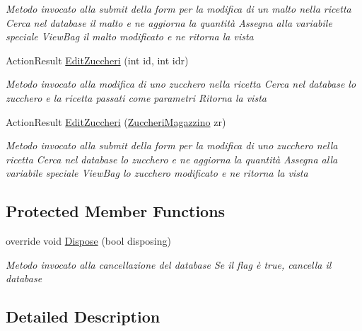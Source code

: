 \begin{DoxyCompactItemize}
\begin{DoxyCompactList}\small\item\em Metodo invocato alla submit della form per la modifica di un malto nella ricetta Cerca nel database il malto e ne aggiorna la quantità Assegna alla variabile speciale View\+Bag il malto modificato e ne ritorna la vista \end{DoxyCompactList}\item 
Action\+Result \mbox{\hyperlink{class_brew_day2_1_1_controllers_1_1_magazzino_controller_ad0e1622fc890ea97625986b92a51bef7}{Edit\+Zuccheri}} (int id, int idr)
\begin{DoxyCompactList}\small\item\em Metodo invocato alla modifica di uno zucchero nella ricetta Cerca nel database lo zucchero e la ricetta passati come parametri Ritorna la vista \end{DoxyCompactList}\item 
Action\+Result \mbox{\hyperlink{class_brew_day2_1_1_controllers_1_1_magazzino_controller_a4b6a33464ce61ed09a75150346c379fb}{Edit\+Zuccheri}} (\mbox{\hyperlink{class_brew_day2_1_1_models_1_1_zuccheri_magazzino}{Zuccheri\+Magazzino}} zr)
\begin{DoxyCompactList}\small\item\em Metodo invocato alla submit della form per la modifica di uno zucchero nella ricetta Cerca nel database lo zucchero e ne aggiorna la quantità Assegna alla variabile speciale View\+Bag lo zucchero modificato e ne ritorna la vista \end{DoxyCompactList}\end{DoxyCompactItemize}
\subsection*{Protected Member Functions}
\begin{DoxyCompactItemize}
\item 
override void \mbox{\hyperlink{class_brew_day2_1_1_controllers_1_1_magazzino_controller_abc1d041b34327990c17bd1d410af61c5}{Dispose}} (bool disposing)
\begin{DoxyCompactList}\small\item\em Metodo invocato alla cancellazione del database Se il flag è true, cancella il database \end{DoxyCompactList}\end{DoxyCompactItemize}


\subsection{Detailed Description}


